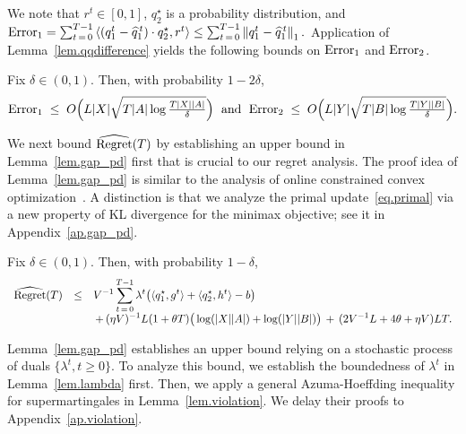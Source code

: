 \documentclass[12pt, final]{l4dc2023}
\begin{document}
We note that $r^t\in [0,1]$, $q_2^\star$ is a probability distribution, and 
${\text{\normalfont Error}_1} 
=
\sum_{t\,=\,0}^{T-1} \inner{( q_1^t-\hat q_1^{\,t} ) \cdot q_2^\star}{r^t} 
\leq
\sum_{t\,=\,0}^{T-1} \norm{q_1^t-\hat q_1^{\,t} }_1.$
Application of Lemma~\ref{lem.qqdifference} yields the following bounds on ${\text{\normalfont Error}_1}$ and ${\text{\normalfont Error}_2}$. 
\begin{lemma}\label{lem.error12}
	Fix $\delta\in(0,1)$. Then, with probability $1-2\delta$,
	\[
	{\text{\normalfont Error}_1} \; \leq \; O\Big(L|X|\sqrt{T|A| \log\tfrac{T|X||A|}{\delta}}\Big)
	\;  \text{ and } \;
	{\text{\normalfont Error}_2} \; \leq \; O\Big(L|Y|\sqrt{T|B| \log\tfrac{T|Y||B|}{\delta}}\Big).
	\]
\end{lemma}

We next bound ${\hat{\text{\normalfont Regret}}(T)}$ by establishing an upper bound in Lemma~\ref{lem.gap_pd} first that is crucial to our regret analysis. The proof idea of Lemma~\ref{lem.gap_pd} is similar to the analysis of online constrained convex optimization~\citep{yu2017online,wei2020online}. A distinction is that we analyze the primal update~\eqref{eq.primal} via a new property of KL divergence for the minimax objective; see it in Appendix~\ref{ap.gap_pd}. 
\begin{lemma}\label{lem.gap_pd}
	Fix $\delta\in (0,1)$. Then, with probability $1-\delta$,
	\[
	\begin{array}{rcl}
	\displaystyle
	{\hat{\text{\normalfont Regret}}(T)}
	&\leq& \displaystyle V^{-1}
	\sum_{t\,=\,0}^{T-1}
	\lambda^{t} \big(\langle{ q_1^\star},{g^{t}}\rangle 
	+ \langle{ q_2^\star},{h^{t}}\rangle -b\big)
	\\[0.2cm]
	&&\displaystyle 
	\,+\, (\eta V)^{-1} L (1+\theta T)\big(\log (|X||A|) +\log (|Y||B|)\big) 
	\,+\,(2 V^{-1}L+4\theta +\eta V) LT.
	\end{array}
	\]
\end{lemma}

Lemma~\ref{lem.gap_pd} establishes an upper bound relying on a stochastic process of duals $\{\lambda^t,t\geq 0\}$. To analyze this bound, we establish the boundedness of $\lambda^t$ in Lemma~\ref{lem.lambda} first. Then, we apply a general Azuma-Hoeffding inequality for supermartingales in Lemma~\ref{lem.violation}. We delay their proofs to Appendix~\ref{ap.violation}.
\end{document}
